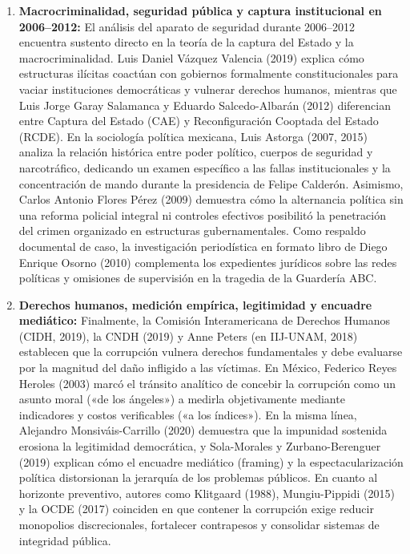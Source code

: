 \begin{enumerate}
  \item \textbf{Macrocriminalidad, seguridad pública y captura institucional en 2006--2012:} El análisis del aparato de seguridad durante 2006--2012 encuentra sustento directo en la teoría de la captura del Estado y la macrocriminalidad. Luis Daniel Vázquez Valencia (2019) explica cómo estructuras ilícitas coactúan con gobiernos formalmente constitucionales para vaciar instituciones democráticas y vulnerar derechos humanos, mientras que Luis Jorge Garay Salamanca y Eduardo Salcedo-Albarán (2012) diferencian entre Captura del Estado (CAE) y Reconfiguración Cooptada del Estado (RCDE). En la sociología política mexicana, Luis Astorga (2007, 2015) analiza la relación histórica entre poder político, cuerpos de seguridad y narcotráfico, dedicando un examen específico a las fallas institucionales y la concentración de mando durante la presidencia de Felipe Calderón. Asimismo, Carlos Antonio Flores Pérez (2009) demuestra cómo la alternancia política sin una reforma policial integral ni controles efectivos posibilitó la penetración del crimen organizado en estructuras gubernamentales. Como respaldo documental de caso, la investigación periodística en formato libro de Diego Enrique Osorno (2010) complementa los expedientes jurídicos sobre las redes políticas y omisiones de supervisión en la tragedia de la Guardería ABC.

  \item \textbf{Derechos humanos, medición empírica, legitimidad y encuadre mediático:} Finalmente, la Comisión Interamericana de Derechos Humanos (CIDH, 2019), la CNDH (2019) y Anne Peters (en IIJ-UNAM, 2018) establecen que la corrupción vulnera derechos fundamentales y debe evaluarse por la magnitud del daño infligido a las víctimas. En México, Federico Reyes Heroles (2003) marcó el tránsito analítico de concebir la corrupción como un asunto moral («de los ángeles») a medirla objetivamente mediante indicadores y costos verificables («a los índices»). En la misma línea, Alejandro Monsiváis-Carrillo (2020) demuestra que la impunidad sostenida erosiona la legitimidad democrática, y Sola-Morales y Zurbano-Berenguer (2019) explican cómo el encuadre mediático (framing) y la espectacularización política distorsionan la jerarquía de los problemas públicos. En cuanto al horizonte preventivo, autores como Klitgaard (1988), Mungiu-Pippidi (2015) y la OCDE (2017) coinciden en que contener la corrupción exige reducir monopolios discrecionales, fortalecer contrapesos y consolidar sistemas de integridad pública.
\end{enumerate}

